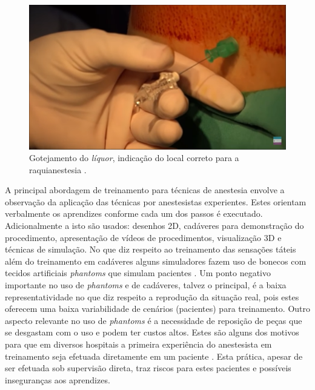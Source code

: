 \begin{figure}[h!]
    \centering
    \includegraphics[scale=0.35,keepaspectratio=true]{figuras/3.GotejamentoLiquor.png}
    \caption{Gotejamento do \textit{líquor}, indicação do local correto para a raquianestesia \cite{Londero2018}.}
    \label{fig:gotejamentoLiquor}
\end{figure}

A principal abordagem de treinamento para técnicas de anestesia envolve a observação da aplicação das técnicas por anestesistas experientes. Estes orientam verbalmente os aprendizes conforme cada um dos passos é executado. Adicionalmente a isto são usados: desenhos 2D, cadáveres para demonstração do procedimento, apresentação de vídeos de procedimentos, visualização 3D e técnicas de simulação. No que diz respeito ao treinamento das sensações táteis além do treinamento em cadáveres alguns simuladores fazem uso de bonecos com tecidos artificiais \textit{phantoms} que simulam pacientes \cite{Dreifaldt2006}. Um ponto negativo importante no uso de \textit{phantoms} e de cadáveres, talvez o principal, é a baixa representatividade no que diz respeito a reprodução da situação real, pois estes oferecem uma baixa variabilidade de cenários (pacientes) para treinamento.  Outro aspecto relevante no uso de \textit{phantoms} é a necessidade de reposição de peças que se desgastam com o uso e podem ter custos altos. Estes são alguns dos motivos para que em diversos hospitais a primeira experiência do anestesista em treinamento seja efetuada diretamente em um paciente \cite{Aggarwal2009, Grantcharov2008, Smith2005, Watterson2007}. Esta prática, apesar de ser efetuada sob supervisão direta, traz riscos para estes pacientes e possíveis inseguranças aos aprendizes. 


